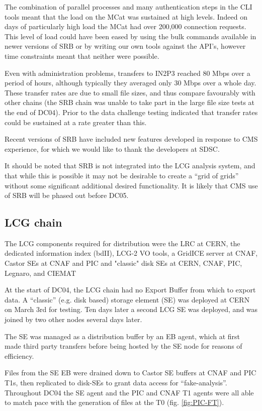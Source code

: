 \documentclass{cmspaper}
\begin{document}
The combination of parallel processes and many authentication steps in the CLI tools meant that the load on the MCat was sustained at high levels. Indeed on days of particularly high load the MCat had over 200,000 connection requests. This level of load could have been eased by using the bulk commands available in newer versions of SRB or by writing our own tools against the API's, however time constraints meant that neither were possible.

Even with administration problems, transfers to IN2P3 reached 80 Mbps over a period of hours, although typically they averaged only 30 Mbps over a whole day. These transfer rates are due to small file sizes, and thus compare favourably with other chains (the SRB chain was unable to take part in the large file size tests at the end of DC04). Prior to the data challenge testing indicated that transfer rates could be sustained at a rate greater than this.

Recent versions of SRB have included new features developed in response to CMS experience, for which we would like to thank the developers at SDSC.

It should be noted that SRB is not integrated into the LCG analysis system, and that while this is possible \cite{gmcat} it may not be desirable to create a ``grid of grids'' without some significant additional desired functionality.  It is likely that CMS use of SRB will be phased out before DC05.


\subsection{LCG chain}
The LCG components required for distribution were the LRC at CERN, the
dedicated information index (bdII), LCG-2 VO tools, a GridICE server
at CNAF, Castor SEs at CNAF and PIC and "classic" disk SEs at CERN,
CNAF, PIC, Legnaro, and CIEMAT

At the start of DC04, the LCG chain had no Export Buffer from which to
export data. A ``classic'' (e.g. disk based) storage element (SE) was
deployed at CERN on March 3rd for testing. Ten days later a second LCG
SE was deployed, and was joined by two other nodes several days later.

The SE was managed as a distribution buffer by an EB agent, which at
first made third party transfers before being hosted by the SE node
for reasons of efficiency.

Files from the SE EB were drained down to Castor SE buffers at CNAF
and PIC T1s, then replicated to disk-SEs to grant data access for
``fake-analysis''. Throughout DC04 the SE agent and the PIC and CNAF
T1 agents were all able to match pace with the generation of files at
the T0 (fig. \ref{fig:PIC-FT}).
\end{document}
